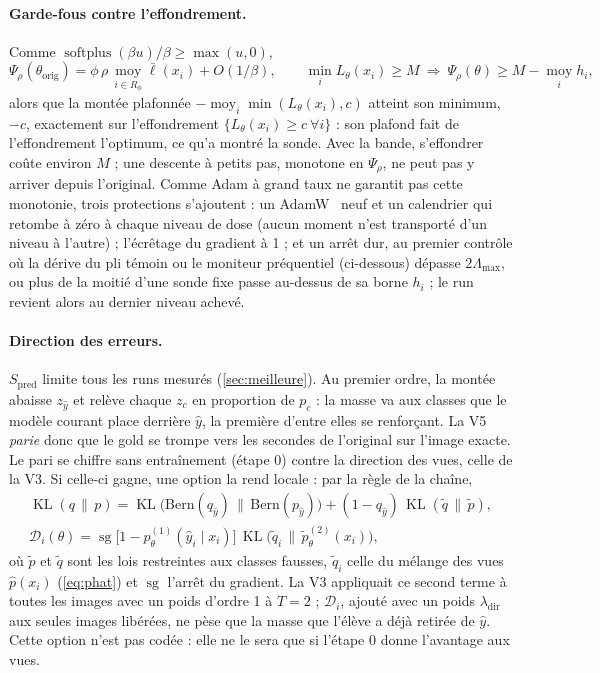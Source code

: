 \documentclass[11pt,a4paper]{article}
\newcommand{\KL}{\operatorname{KL}}
\newcommand{\Exp}{\operatorname*{moy}}
\newcommand{\orig}{\mathrm{orig}}
\begin{document}
\paragraph{Garde-fous contre l'effondrement.} Comme $\operatorname{softplus}(\beta u)/\beta\ge\max(u,0)$,
\begin{equation}\label{eq:v5energy}
  \Psi_\rho(\theta_\orig)=\phi\,\rho\,\Exp_{i\in R_\phi}\bar\ell(x_i)+O(1/\beta),\qquad
  \min_iL_\theta(x_i)\ge M\ \Longrightarrow\ \Psi_\rho(\theta)\ge M-\Exp_ih_i ,
\end{equation}
alors que la montée plafonnée $-\Exp_i\min(L_\theta(x_i),c)$ atteint son minimum, $-c$, exactement sur
l'effondrement $\{L_\theta(x_i)\ge c\ \forall i\}$ : son plafond fait de l'effondrement l'optimum, ce
qu'a montré la sonde. Avec la bande, s'effondrer coûte environ $M$ ; une descente à petits pas,
monotone en $\Psi_\rho$, ne peut pas y arriver depuis l'original. Comme Adam à grand taux ne garantit
pas cette monotonie, trois protections s'ajoutent : un AdamW~\cite{loshchilov2019} neuf et un
calendrier qui retombe à zéro à chaque niveau de dose (aucun moment n'est transporté d'un niveau à
l'autre) ; l'écrêtage du gradient à 1 ; et un arrêt dur, au premier contrôle où la dérive du pli
témoin ou le moniteur préquentiel (ci-dessous) dépasse $2\Lambda_{\max}$, ou plus de la moitié d'une
sonde fixe passe au-dessus de sa borne $h_i$ ; le run revient alors au dernier niveau achevé.

\paragraph{Direction des erreurs.} $S_{\text{pred}}$ limite tous les runs mesurés
(\cref{sec:meilleure}). Au premier ordre, la montée abaisse $z_{\hat y}$ et relève chaque $z_c$ en
proportion de $p_c$ : la masse va aux classes que le modèle courant place derrière $\hat y$, la
première d'entre elles se renforçant. La V5 \emph{parie} donc que le gold se trompe vers les secondes
de l'original sur l'image exacte. Le pari se chiffre sans entraînement (étape 0) contre la direction
des vues, celle de la V3. Si celle-ci gagne, une option la rend locale : par la règle de la chaîne,
\begin{equation}\label{eq:v5dir}
  \begin{gathered}
  \KL(q\,\|\,p)=\KL\bigl(\mathrm{Bern}(q_{\hat y})\,\|\,\mathrm{Bern}(p_{\hat y})\bigr)+(1-q_{\hat y})\,\KL(\tilde q\,\|\,\tilde p),\\
  \mathcal D_i(\theta)=\operatorname{sg}\bigl[1-p^{(1)}_\theta(\hat y_i\mid x_i)\bigr]\,
  \KL\bigl(\tilde q_i\,\|\,\tilde p^{(2)}_\theta(x_i)\bigr),
  \end{gathered}
\end{equation}
où $\tilde p$ et $\tilde q$ sont les lois restreintes aux classes fausses, $\tilde q_i$ celle du mélange
des vues $\hat p(x_i)$ (\cref{eq:phat}) et $\operatorname{sg}$ l'arrêt du gradient. La V3 appliquait ce
second terme à toutes les images avec un poids d'ordre 1 à $T=2$ ; $\mathcal D_i$, ajouté avec un poids
$\lambda_{\text{dir}}$ aux seules images libérées, ne pèse que la masse que l'élève a déjà retirée de
$\hat y$. Cette option n'est pas codée : elle ne le sera que si l'étape 0 donne l'avantage aux vues.
\end{document}
